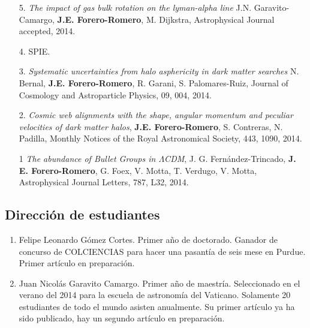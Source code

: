 \documentclass{article}
\begin{document}
\begin{enumerate}

\item[5.]{\it The impact of gas bulk rotation on the lyman-alpha line}
  J.N. Garavito-Camargo,  {\bf J.E. Forero-Romero}, M. Dijkstra,
  Astrophysical Journal
  accepted, 2014. 

\item[4.]{\it }SPIE.

\item[3.]{\it Systematic uncertainties from halo asphericity in dark
  matter searches}  N. Bernal, {\bf J.E. Forero-Romero}, R. Garani,
  S. Palomares-Ruiz, Journal of Cosmology and Astroparticle Physics,
  09, 004, 2014. 

\item[2.]{\it Cosmic web alignments with the shape, angular momentum
  and peculiar velocities of dark matter halos}, 
  {\bf J.E. Forero-Romero}, S. Contreras, N. Padilla, Monthly Notices
  of the Royal Astronomical Society, 443,
  1090, 2014. 

\item[1]{\it The abundance of Bullet Groups in $\Lambda$CDM},
  J. G. Fern\'andez-Trincado, {\bf J. E. Forero-Romero}, G. Foex,
  V. Motta, T. Verdugo, V. Motta, Astrophysical Journal Letters, 787, L32, 2014.
\end{enumerate}

\subsection{Direcci\'on de estudiantes}

\begin{enumerate}
\item{Felipe Leonardo G\'omez Cortes. Primer a\~no de doctorado. Ganador
  de concurso de COLCIENCIAS para hacer una pasant\'ia de seis mese en
  Purdue. Primer art\'iculo en preparaci\'on.} 

\item{Juan Nicol\'as Garavito Camargo. Primer a\~no de
  maestr\'ia. Seleccionado en el verano del 2014 para la escuela de
  astronom\'ia del Vaticano. Solamente 20 estudiantes de todo el mundo
asisten anualmente. Su primer art\'iculo ya ha sido publicado, hay un segundo
art\'iculo en preparaci\'on.}
\end{enumerate}
\end{document}
